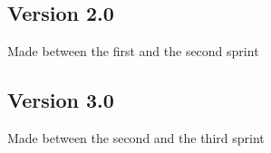 \documentclass{article}
\begin{document}
\begin{center}
\vspace*{3in}
\subsection{Version 2.0}
Made between the first and the second sprint
\end{center}


\begin{center}
\vspace*{3in}
\subsection{Version 3.0}
Made between the second and the third sprint
\end{center}

\end{document}
